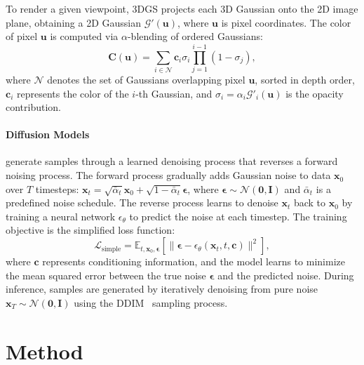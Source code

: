 \documentclass[runningheads]{llncs}
\begin{document}
To render a given viewpoint, 3DGS projects each 3D Gaussian onto the 2D image plane, obtaining a 2D Gaussian $\mathcal{G}'(\mathbf{u})$, where $\mathbf{u}$ is pixel coordinates. The color of pixel $\mathbf{u}$ is computed via $\alpha$-blending of ordered Gaussians:
\begin{equation}
\mathbf{C}(\mathbf{u}) = \sum_{i \in \mathcal{N}} \mathbf{c}_i \sigma_i \prod_{j=1}^{i-1} (1 - \sigma_j),
\end{equation}
where $\mathcal{N}$ denotes the set of Gaussians overlapping pixel $\mathbf{u}$, sorted in depth order, $\mathbf{c}_i$ represents the color of the $i$-th Gaussian, and $\sigma_i = \alpha_i \mathcal{G}'_i(\mathbf{u})$ is the opacity contribution.

\paragraph{Diffusion Models}
generate samples through a learned denoising process that reverses a forward noising process. The forward process gradually adds Gaussian noise to data $\mathbf{x}_0$ over $T$ timesteps: $\mathbf{x}_t = \sqrt{\bar{\alpha}_t}\mathbf{x}_0 + \sqrt{1-\bar{\alpha}_t}\boldsymbol{\epsilon}$, where $\boldsymbol{\epsilon} \sim \mathcal{N}(\mathbf{0}, \mathbf{I})$ and $\bar{\alpha}_t$ is a predefined noise schedule. The reverse process learns to denoise $\mathbf{x}_t$ back to $\mathbf{x}_0$ by training a neural network $\epsilon_\theta$ to predict the noise at each timestep. The training objective is the simplified loss function:
\begin{equation}
\mathcal{L}_{\text{simple}} = \mathbb{E}_{t,\mathbf{x}_0,\boldsymbol{\epsilon}}\left[\|\boldsymbol{\epsilon} - \epsilon_\theta(\mathbf{x}_t, t, \mathbf{c})\|^2\right],
\end{equation}
where $\mathbf{c}$ represents conditioning information, and the model learns to minimize the mean squared error between the true noise $\boldsymbol{\epsilon}$ and the predicted noise. During inference, samples are generated by iteratively denoising from pure noise $\mathbf{x}_T \sim \mathcal{N}(\mathbf{0}, \mathbf{I})$ using the DDIM~\cite{song2021denoising} sampling process.



\section{Method}
\label{sec:method}
\end{document}

